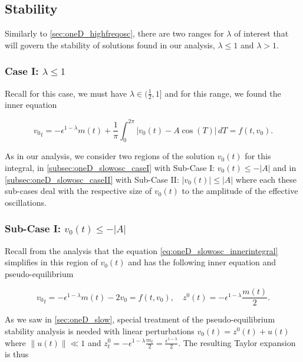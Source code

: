 \subsection{Stability}

Similarly to \autoref{sec:oneD_highfreqosc}, there are two ranges for $\lambda$ of interest that will govern the stability of solutions found in our analysis, $\lambda\le 1$ and $\lambda>1$.

\subsubsection{Case I: $\lambda\le 1$}

Recall for this case, we must have $\lambda\in (\frac{1}{2},1]$ and for this range, we found the inner equation

\begin{equation}\label{eq:oneD_slowosc_innerintegral}
{v_0}_t= -\epsilon^{1-\lambda}m(t)+\frac{1}{\pi}\int_0^{2\pi}| v_0(t)- A\cos(T)|\,dT=f(t,v_0).
\end{equation}

As in our analysis, we consider two regions of the solution $v_0(t)$ for this integral, in \autoref{subsec:oneD_slowosc_caseI} with Sub-Case I: $v_0(t)\le - |A|$ and in \autoref{subsec:oneD_slowosc_caseII} with Sub-Case II: $|v_0(t)|\le |A|$ where each these sub-cases deal with the respective size of $v_0(t)$ to the amplitude of the effective oscillations.

\subsubsection*{Sub-Case I: $v_0(t)\le - |A|$}

Recall from the analysis that the equation \eqref{eq:oneD_slowosc_innerintegral} simplifies in this region of $v_0(t)$ and has the following inner equation and pseudo-equilibrium

\begin{equation}\label{eq:oneD_slowosc_stabilitysubcaseI}
{v_0}_t= -\epsilon^{1-\lambda}m(t) -2v_0=f(t,v_0), \quad z^0(t)=-\epsilon^{1-\lambda}\frac{m(t)}{2}.
\end{equation}

As we saw in \autoref{sec:oneD_slow}, special treatment of the pseudo-equilibrium stability analysis is needed with linear perturbations $v_0(t)=z^0(t)+u(t)$ where $\lVert u(t)\rVert \ll 1$ and $z^0_t = -\epsilon^{1-\lambda}\frac{m_t}{2}=\frac{\epsilon^{1-\lambda}}{2}$. The resulting Taylor expansion is thus

